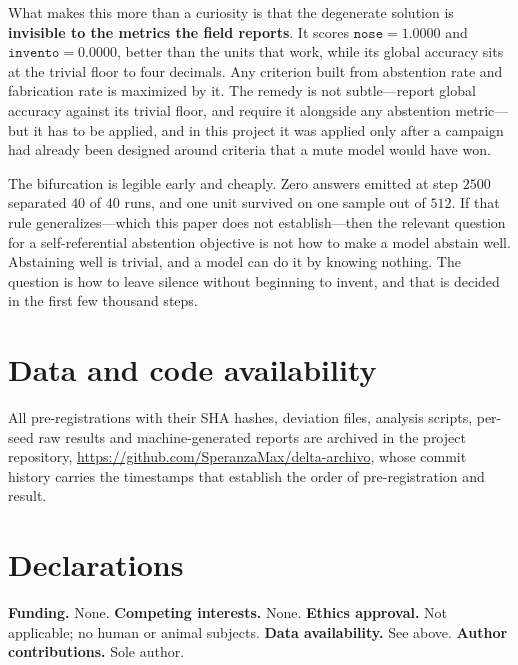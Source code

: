 \documentclass[11pt,a4paper]{article}
\begin{document}
What makes this more than a curiosity is that the degenerate solution is \textbf{invisible to the
metrics the field reports}. It scores $\texttt{nose} = 1.0000$ and $\texttt{invento} = 0.0000$,
better than the units that work, while its global accuracy sits at the trivial floor to four decimals.
Any criterion built from abstention rate and fabrication rate is maximized by it. The remedy is not
subtle---report global accuracy against its trivial floor, and require it alongside any abstention
metric---but it has to be applied, and in this project it was applied only after a campaign had
already been designed around criteria that a mute model would have won.

The bifurcation is legible early and cheaply. Zero answers emitted at step $2500$ separated $40$ of
$40$ runs, and one unit survived on one sample out of $512$. If that rule generalizes---which this
paper does not establish---then the relevant question for a self-referential abstention objective is
not how to make a model abstain well. Abstaining well is trivial, and a model can do it by knowing
nothing. The question is how to leave silence without beginning to invent, and that is decided in the
first few thousand steps.

\section*{Data and code availability}

All pre-registrations with their SHA hashes, deviation files, analysis scripts, per-seed raw results
and machine-generated reports are archived in the project repository,
\url{https://github.com/SperanzaMax/delta-archivo}, whose commit history carries the timestamps that
establish the order of pre-registration and result.

\section*{Declarations}

\textbf{Funding.} None. \textbf{Competing interests.} None. \textbf{Ethics approval.} Not applicable;
no human or animal subjects. \textbf{Data availability.} See above. \textbf{Author contributions.}
Sole author.
\end{document}
